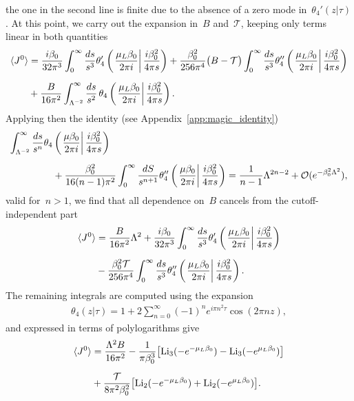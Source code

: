 \documentclass[11pt,a4paper]{article}
\begin{document}
the one in the second line 
is finite due to the absence of a zero mode in~$\theta_{4}'(z|\tau)$.
At this point, we carry out the expansion in~$B$ and~$\mathcal{T}$, keeping only terms linear
in both quantities
\begin{align}
\langle J^{0}\rangle
&={i\beta_{0}\over 32\pi^{3}}
\int_{0}^{\infty}{ds\over s^{3}}
\theta_{4}'\left(\left.{\mu_{L}\beta_{0}\over 2\pi i}\right|{i\beta_{0}^{2}\over 4\pi s}\right)
+{\beta_{0}^{2}\over 256\pi^{4}}\big(B-\mathcal{T}\big)
\int_{0}^{\infty}{ds\over s^{3}}
\theta_{4}''\left(\left.{\mu_{L}\beta_{0}\over 2\pi i}\right|{i\beta_{0}^{2}\over 4\pi s}\right)
\nonumber \\[0.2cm]
&+{B\over 16\pi^2}\int_{\Lambda^{-2}}^{\infty}{ds \over s^{2}}\,
\theta_{4}\left(\left.{\mu_{L}\beta_{0}\over 2\pi i}\right|{i\beta_{0}^{2}\over 4\pi s}\right).
\label{eq:<psi+psi>_second}
\end{align}
Applying then the identity (see Appendix~\ref{app:magic_identity})
\begin{align}
\int_{\Lambda^{-2}}^{\infty}{ds\over s^{n}}\theta_{4}&\left(\left.
{\mu\beta_{0}\over 2\pi i}\right|
{i\beta_{0}^{2}\over 4\pi s}\right) \nonumber \\[0.2cm]
&+{\beta_{0}^{2}\over 16(n-1)\pi^{2}}\int_{0}^{\infty}{dS\over s^{n+1}}\theta_{4}''\left(\left.
{\mu\beta_{0}\over 2\pi i}\right|
{i\beta_{0}^{2}\over 4\pi s}\right)
=
{1\over n-1}\Lambda^{2n-2}
+\mathcal{O}(e^{-\beta_{0}^{2}\Lambda^{2}}),
\label{eq:magic_identity}
\end{align}
valid for~$n>1$, 
we find that all dependence on~$B$ cancels from the cutoff-independent part
\begin{align}
\langle J^{0}\rangle
&={B\over 16\pi^2}\Lambda^{2}
+{i\beta_{0}\over 32\pi^{3}}
\int_{0}^{\infty}{ds\over s^{3}}
\theta_{4}'\left(\left.{\mu_{L}\beta_{0}\over 2\pi i}
\right|{i\beta_{0}^{2}\over 4\pi s}\right) \nonumber \\[0.2cm]
&-{\beta_{0}^{2}\mathcal{T}\over 256\pi^{4}}
\int_{0}^{\infty}{ds\over s^{3}}
\theta_{4}''\left(\left.{\mu_{L}\beta_{0}\over 2\pi i}\right|{i\beta_{0}^{2}\over 4\pi s}\right).
\end{align}
The remaining integrals are computed using the expansion
\begin{align}
\theta_{4}(z|\tau)=1+2\sum_{n=0}^{\infty}(-1)^{n}e^{i\pi n^{2}\tau}\cos(2\pi nz),
\label{eq:theta4expansion}
\end{align} 
and expressed in terms of polylogarithms give
\begin{align}
\langle J^{0}\rangle
&={\Lambda^{2}B\over 16\pi^2}
-{1\over \pi\beta_{0}^{3}}
\big[{\rm Li}_{3}(-e^{-\mu_{L}\beta_{0}})
-{\rm Li}_{3}(-e^{\mu_{L}\beta_{0}})\big] \nonumber \\[0.2cm]
&+{\mathcal{T}\over 8\pi^{2}\beta_{0}^{2}}\big[{\rm Li}_{2}(-e^{-\mu_{L}\beta_{0}})
+{\rm Li}_{2}(-e^{\mu_{L}\beta_{0}})\big].
\end{align}
\end{document}

